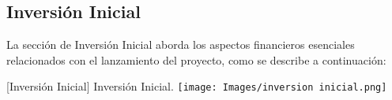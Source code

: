 \subsection{Inversión Inicial}

La sección de Inversión Inicial aborda los aspectos financieros esenciales relacionados con el lanzamiento del proyecto, como se describe a continuación: 

\vspace{2mm}
\begin{minipage}{0.9\textwidth}
\centering
{}[{Inversión Inicial}]{ Inversión Inicial. }
\label{ingresos}
\texttt{[image: Images/inversion inicial.png]}
\end{minipage}

